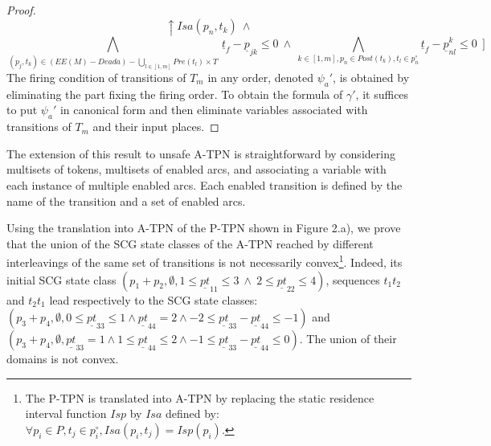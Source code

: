 \documentclass[submission,copyright,creativecommons]{eptcs}
\newtheorem{proof}{Proof}
\numberwithin{equation}{section}
\begin{document}
\begin{proof}
$${\uparrow Isa(p_{n},t_k)} \ \wedge $$   $$ \underset{(p_j,t_k) \in (EE(M)-Deada) - \underset{l \in [1,m]} \bigcup Pre(t_{l}) \times T} \bigwedge   \  \underline{t}_{f} - \underline{p}_{jk} \leq 0  \  \wedge  \   \underset{ k \in[1,m], p_n \in Post(t_{k}), t_l \in p_n^\circ } \bigwedge \underline{t}_{f} - \underline{p}_{nl}^k \leq 0 \ \ ]$$
The firing condition of transitions of $T_m$ in any order, denoted $\psi_a'$, is obtained by eliminating the part fixing the firing order. To obtain the formula of $\gamma'$, it suffices to put $\psi_a'$ in canonical form and then eliminate variables associated with transitions of $T_m$ and their input places. \normalsize
 \end{proof}

\par The extension of this result to unsafe A-TPN is straightforward by considering multisets of tokens, multisets of enabled arcs, and associating a variable with each instance of multiple enabled arcs. Each enabled transition is defined by the name of the transition and a set of enabled arcs.

\par Using the translation into A-TPN of the P-TPN shown in Figure 2.a), we prove that the union of the SCG state classes of the A-TPN reached by different interleavings of the same set of transitions is not necessarily convex\footnote{The P-TPN is translated into A-TPN by replacing the static residence interval function $Isp$ by $Isa$ defined by: $\forall p_i \in P, t_j \in p_i^\circ, Isa(p_i,t_j)=Isp(p_i)$.}. Indeed, its initial SCG state class $(p_1+p_2, \emptyset, 1 \leq \underline{pt}_{11} \leq 3 \
\wedge \ 2 \leq \underline{pt}_{22} \leq 4)$, sequences $t_1t_2$ and $t_2t_1$ lead
respectively to the SCG state classes: $(p_3+p_4, \emptyset, 0 \leq \underline{pt}_{33}
\leq 1 \wedge \underline{pt}_{44}=2 \wedge -2 \leq \underline{pt}_{33}-\underline{pt}_{44} \leq -1)$ and $(p_3+p_4, \emptyset, \underline{pt}_{33}=1 \wedge 1 \leq \underline{pt}_{44} \leq 2 \wedge -1 \leq \underline{pt}_{33}-\underline{pt}_{44} \leq 0)$. The union of their domains is not convex.
\end{document}
